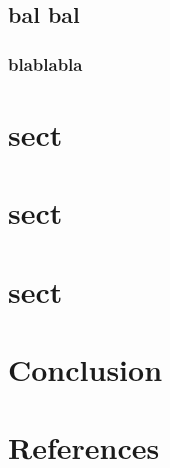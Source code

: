 \documentclass[final, paper=letter,5p,times,twocolumn]{elsarticle}
\begin{document}
\subsection{bal bal}


\subsubsection{blablabla}


\section{sect}

\section{sect}

\section{sect}


\section{Conclusion}

\section*{References}



\end{document}
